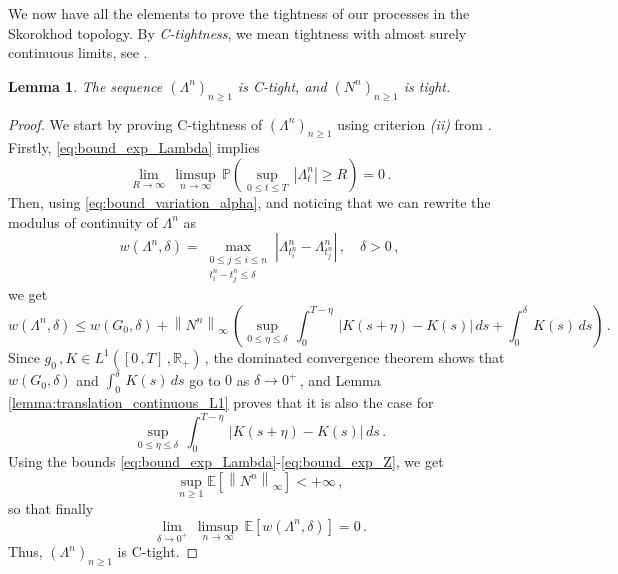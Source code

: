 \documentclass{article}
\newcommand{\R}{\mathbb{R}}
\newcommand{\1}{\mathbbm{1}}
\newtheorem{lemma}[theorem]{Lemma}
\numberwithin{equation}{section}
\begin{document}
We now have all the elements to prove the tightness of our processes in the Skorokhod topology. By \textit{C-tightness}, we mean tightness with almost surely continuous limits, see \citet[Definition~VI.3.25]{jacod2013limit}.
\begin{lemma}
    \label{lemma:tightness}
    The sequence $\left(\Lambda^n\right)_{n \geq 1}$ is C-tight, and $\left( N^n \right)_{n \geq 1}$ is tight.
\end{lemma}
\begin{proof}
    We start by proving C-tightness of $\left(\Lambda^n\right)_{n \geq 1}$ using criterion \textit{(ii)} from \citet[Proposition~VI.3.26]{jacod2013limit}. Firstly, \eqref{eq:bound_exp_Lambda} implies
    $$
    \lim_{R \to \infty}\, \limsup_{n \to \infty}\,\mathbb P \left(\sup_{0 \leq t \leq T}\, \left|\Lambda^n_t\right| \geq R \right) = 0\,. 
    $$
    Then, using \eqref{eq:bound_variation_alpha}, and noticing that we can rewrite the modulus of continuity of $\Lambda^n$ as 
    $$
    w\left(\Lambda^n, \delta\right) = \max_{\substack{0 \leq j \leq i \leq n \\ t^n_i - t^n_j \leq \delta}} \left|\Lambda^n_{t^n_i} - \Lambda^n_{t^n_j}\right|\,, \quad \delta > 0\,,
    $$
    we get 
    $$
w\left(\Lambda^n,\delta\right) \leq w\left(G_0, \delta\right) + \left\|N^n\right\|_{\infty}\, \left(\sup_{0 \leq \eta \leq \delta}\, \int_0^{T-\eta}\, \left|K(s + \eta) - K(s)\right|\,ds + \int_0^{\delta}\, K(s)\,ds \right) \,.
    $$
Since $g_0\,,K \in L^1([0\,, T]\,, \R_+)\,$, the dominated convergence theorem shows that $w(G_0,\delta)$ and $\int_0^{\delta}\,K(s)\,ds$ go to $0$ as $\delta \to 0^+\,$, and Lemma \ref{lemma:translation_continuous_L1} proves that it is also the case for 
$$
\sup_{0 \leq \eta \leq \delta}\, \int_0^{T-\eta} \, \left|K(s + \eta) - K(s)\right|\, ds\,.
$$
Using the bounds \eqref{eq:bound_exp_Lambda}-\eqref{eq:bound_exp_Z}, we get
$$
\sup_{n \geq 1} \mathbb E \left[\left\|N^n\right\|_{\infty}\right] < + \infty\,,
$$
so that finally
\begin{equation}
\label{eq:limit_exp_continuity_modulus_Lambda}
\lim_{\delta \to 0^+}\, \limsup_{n \to \infty}\, \mathbb E \left[w\left(\Lambda^n, \delta\right)\right] = 0\,.
\end{equation}
Thus, $\left(\Lambda^n\right)_{n \geq 1}$ is C-tight.



\end{proof}
\end{document}
